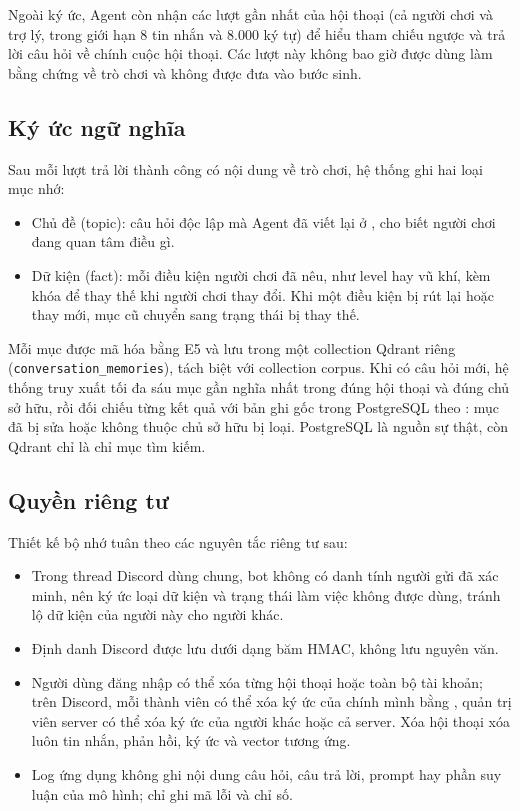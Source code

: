 Ngoài ký ức, Agent còn nhận các lượt gần nhất của hội thoại (cả người chơi và trợ lý, trong giới hạn 8 tin nhắn và 8.000 ký tự) để hiểu tham chiếu ngược và trả lời câu hỏi về chính cuộc hội thoại. Các lượt này không bao giờ được dùng làm bằng chứng về trò chơi và không được đưa vào bước sinh.

\subsection{Ký ức ngữ nghĩa}
\label{sec:mem_semantic}

Sau mỗi lượt trả lời thành công có nội dung về trò chơi, hệ thống ghi hai loại mục nhớ:
\begin{itemize}
    \item Chủ đề (topic): câu hỏi độc lập mà Agent đã viết lại ở , cho biết người chơi đang quan tâm điều gì.
    \item Dữ kiện (fact): mỗi điều kiện người chơi đã nêu, như level hay vũ khí, kèm khóa để thay thế khi người chơi thay đổi. Khi một điều kiện bị rút lại hoặc thay mới, mục cũ chuyển sang trạng thái bị thay thế.
\end{itemize}
Mỗi mục được mã hóa bằng E5 và lưu trong một collection Qdrant riêng (\nolinkurl{conversation_memories}), tách biệt với collection corpus. Khi có câu hỏi mới, hệ thống truy xuất tối đa sáu mục gần nghĩa nhất trong đúng hội thoại và đúng chủ sở hữu, rồi đối chiếu từng kết quả với bản ghi gốc trong PostgreSQL theo : mục đã bị sửa hoặc không thuộc chủ sở hữu bị loại. PostgreSQL là nguồn sự thật, còn Qdrant chỉ là chỉ mục tìm kiếm.

\subsection{Quyền riêng tư}
\label{sec:privacy}

Thiết kế bộ nhớ tuân theo các nguyên tắc riêng tư sau:
\begin{itemize}
    \item Trong thread Discord dùng chung, bot không có danh tính người gửi đã xác minh, nên ký ức loại dữ kiện và trạng thái làm việc không được dùng, tránh lộ dữ kiện của người này cho người khác.
    \item Định danh Discord được lưu dưới dạng băm HMAC, không lưu nguyên văn.
    \item Người dùng đăng nhập có thể xóa từng hội thoại hoặc toàn bộ tài khoản; trên Discord, mỗi thành viên có thể xóa ký ức của chính mình bằng , quản trị viên server có thể xóa ký ức của người khác hoặc cả server. Xóa hội thoại xóa luôn tin nhắn, phản hồi, ký ức và vector tương ứng.
    \item Log ứng dụng không ghi nội dung câu hỏi, câu trả lời, prompt hay phần suy luận của mô hình; chỉ ghi mã lỗi và chỉ số.
\end{itemize}

